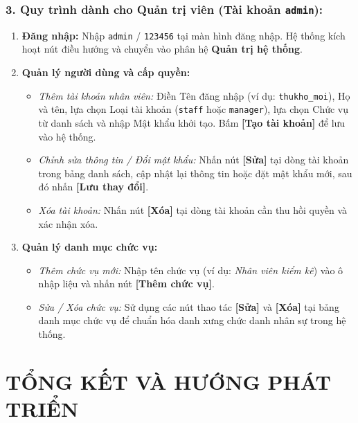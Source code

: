 \documentclass[12pt,a4paper]{article}
\begin{document}
\subsubsection*{3. Quy trình dành cho Quản trị viên (Tài khoản \texttt{admin}):}
\begin{enumerate}
    \item \textbf{Đăng nhập:} Nhập \texttt{admin} / \texttt{123456} tại màn hình đăng nhập. Hệ thống kích hoạt nút điều hướng và chuyển vào phân hệ \textbf{Quản trị hệ thống}.
    \item \textbf{Quản lý người dùng và cấp quyền:}
    \begin{itemize}
        \item \textit{Thêm tài khoản nhân viên:} Điền Tên đăng nhập (ví dụ: \texttt{thukho\_moi}), Họ và tên, lựa chọn Loại tài khoản (\texttt{staff} hoặc \texttt{manager}), lựa chọn Chức vụ từ danh sách và nhập Mật khẩu khởi tạo. Bấm \textbf{[Tạo tài khoản]} để lưu vào hệ thống.
        \item \textit{Chỉnh sửa thông tin / Đổi mật khẩu:} Nhấn nút \textbf{[Sửa]} tại dòng tài khoản trong bảng danh sách, cập nhật lại thông tin hoặc đặt mật khẩu mới, sau đó nhấn \textbf{[Lưu thay đổi]}.
        \item \textit{Xóa tài khoản:} Nhấn nút \textbf{[Xóa]} tại dòng tài khoản cần thu hồi quyền và xác nhận xóa.
    \end{itemize}
    \item \textbf{Quản lý danh mục chức vụ:}
    \begin{itemize}
        \item \textit{Thêm chức vụ mới:} Nhập tên chức vụ (ví dụ: \textit{Nhân viên kiểm kê}) vào ô nhập liệu và nhấn nút \textbf{[Thêm chức vụ]}.
        \item \textit{Sửa / Xóa chức vụ:} Sử dụng các nút thao tác \textbf{[Sửa]} và \textbf{[Xóa]} tại bảng danh mục chức vụ để chuẩn hóa danh xưng chức danh nhân sự trong hệ thống.
    \end{itemize}
\end{enumerate}

\newpage
\section{TỔNG KẾT VÀ HƯỚNG PHÁT TRIỂN}
\label{sec:tong-ket}
\end{document}
